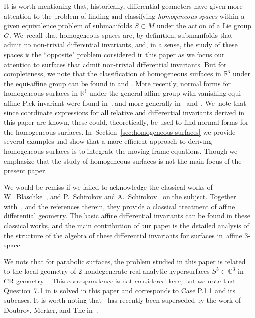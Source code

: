 \documentclass[10pt,a4paper]{amsart}
\numberwithin{equation}{section}
\newcommand{\R}{\mathbb{R}}
\begin{document}
It is worth mentioning that, historically, differential geometers have given more attention to the problem of finding and classifying \emph{homogeneous spaces} within a given equivalence problem of submanifolds $S\subset M$ under the action of a Lie group $G$. We~recall that homogeneous spaces are, by definition, submanifolds that admit no non-trivial differential invariants, and, in a sense, the study of these spaces is the ``opposite" problem considered in this paper as we focus our attention to surfaces that admit non-trivial differential invariants. But for completeness, we note that the classification of homogeneous surfaces in $\mathbb{R}^3$ under the equi-affine group can be found in \cite[Theorem~12.4]{G-1963} and \cite[Chapter~VI]{J-1977}. More recently, normal forms for homogeneous surfaces in $\R^3$ under the general affine group with vanishing equi-affine Pick invariant were found in~\cite{ADV-1997}, and more generally in~\cite{DKR-1996} and~\cite{EE-1999}. We~note that since coordinate expressions for all relative and differential invariants derived in this paper are known, these could, theoretically, be used to find normal forms for the homogeneous surfaces. In~Section~\ref{sec:homogeneous surfaces} we provide several examples and show that a more efficient approach to deriving homogeneous surfaces is to integrate the moving frame equations. Though we emphasize that the study of homogeneous surfaces is not the main focus of the present paper.

We would be remiss if we failed to acknowledge the classical works of W.~Blaschke~\cite{B-1923}, and P.~Schirokov and A.~Schirokov~\cite{SS-1962} on the subject. Together with~\cite{DMMSV-1991}, and the references therein, they provide a classical treatment of affine differential geometry. The basic affine differential invariants can be found in these classical works, and the main contribution of our paper is the detailed analysis of the structure of the algebra of these differential invariants for surfaces in~affine 3-space.

We note that for parabolic surfaces, the problem studied in this paper is related to the local geometry of 2-nondegenerate real analytic hypersurfaces $S^5\subset \mathbb{C}^3$ in CR-geometry~\cite{M-2019}. This correspondence is not considered here, but we note that Question~7.1 in \cite[Section~7]{M-2019} is solved in this paper and corresponds to Case P.1.1 and its subcases. It is worth noting that~\cite{M-2019} has recently been superseded by the work of Doubrov, Merker, and The in~\cite{DMT-2020}.
\end{document}
